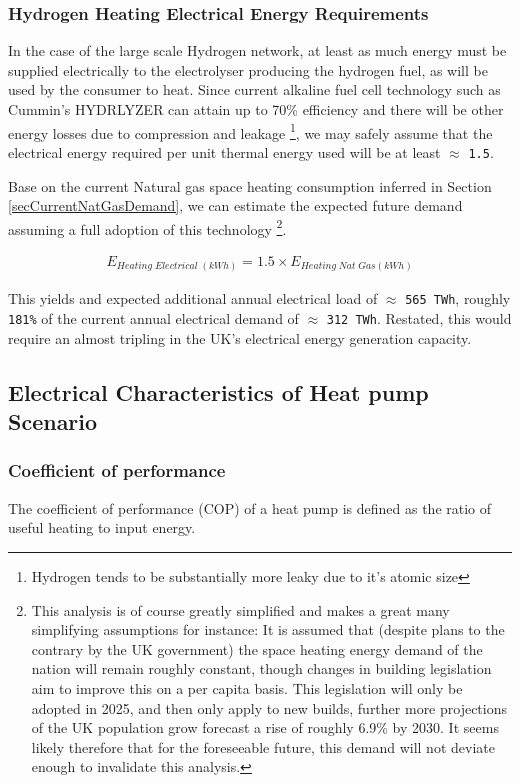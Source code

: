 \documentclass[11pt]{article}
\numberwithin{equation}{section}
\begin{document}
\subsubsection{Hydrogen Heating Electrical Energy Requirements}
\label{sec:org36002e4}
In the case of the large scale Hydrogen network, at least as much energy must be supplied electrically to the electrolyser producing the hydrogen fuel, as will be used by the consumer to heat. Since current alkaline fuel cell technology such as Cummin's HYDRLYZER can attain up to 70\% efficiency \cite{CuminsElectrolizer} and there will be other energy losses due to compression and leakage \footnote{Hydrogen tends to be substantially more leaky due to it's atomic size}, we may safely assume that the electrical energy required per unit thermal energy used will be at least \(\approx\) \texttt{1.5}.

Base on the current Natural gas space heating consumption inferred in Section \ref{secCurrentNatGasDemand}, we can estimate the expected future demand assuming a full adoption of this technology \footnote{This analysis is of course greatly simplified and makes a great many simplifying assumptions for instance: It is assumed that (despite plans to the contrary by the UK government) the space heating energy demand of the nation will remain roughly constant, though changes in building legislation aim to improve this on a per capita basis. This legislation will only be adopted in 2025, and then only apply to new builds, further more projections of the UK population grow forecast a rise of roughly 6.9\% by 2030. It seems likely therefore that for the foreseeable future, this demand will not deviate enough to invalidate this analysis.}.

\begin{align}
\label{eqFutureSpcHeatingDemand}
E_{Heating\;Electrical\;(kWh)} = 1.5\times E_{Heating\;Nat\;Gas (kWh)}
\end{align}

This yields and expected additional annual electrical load of \(\approx\) \texttt{565 TWh}, roughly \texttt{181\%} of the current annual electrical demand of \(\approx\) \texttt{312 TWh}. Restated, this would require an almost tripling in the UK's electrical energy generation capacity.

\subsection{Electrical Characteristics of Heat pump Scenario}
\label{sec:orgef00085}
\subsubsection{Coefficient of performance}
\label{sec:org1600351}
The coefficient of performance (COP) of a heat pump is defined as the ratio of useful heating to input energy.
\end{document}
